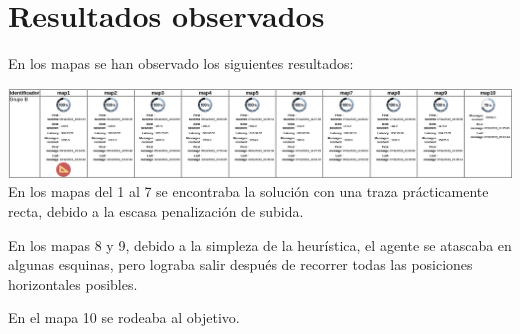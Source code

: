 \documentclass[11pt,a4paper]{article}
\begin{document}
\section{Resultados observados}

En los mapas se han observado los siguientes resultados:

\includegraphics[scale=0.35]{img/resultados}\\[\bigskipamount]

En los mapas del 1 al 7 se encontraba la solución con una traza prácticamente recta, debido a la escasa penalización de subida.

\medskip

En los mapas 8 y 9, debido a la simpleza de la heurística, el agente se atascaba en algunas esquinas, pero lograba salir después de recorrer todas las posiciones horizontales posibles.

\medskip

En el mapa 10 se rodeaba al objetivo. 
\end{document}
